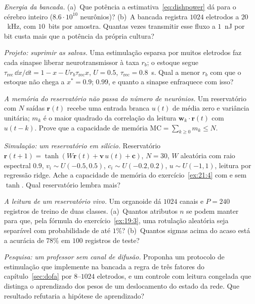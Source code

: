 \begin{exercise}[\lvlA]
\label{ex:21:2}
\emph{Energia da bancada.} (a)~Que potência a estimativa~\eqref{eq:dishpower} dá para o cérebro inteiro ($8.6\cdot10^{10}$ neurônios)? (b)~A bancada registra $1024$ eletrodos a $20$~kHz, com $10$~bits por amostra. Quantas vezes transmitir esse fluxo a $1$~nJ por bit custa mais que a potência da própria cultura?
\end{exercise}

\begin{exercise}[\lvlB]
\label{ex:21:3}
\emph{Projeto: suprimir as salvas.} Uma estimulação esparsa por muitos eletrodos faz cada sinapse liberar neurotransmissor à taxa $r_b$; o estoque segue $\tau_{\text{rec}}\,\dd x/\dd t=1-x-Ur_b\tau_{\text{rec}}x$, $U=0.5$, $\tau_{\text{rec}}=0.8$~s. Qual a menor $r_b$ com que o estoque não chega a $x^*=0.9$; $0.99$, e quanto a sinapse enfraquece com isso?
\end{exercise}

\begin{exercise}[\lvlB]
\label{ex:21:4}
\emph{A memória do reservatório não passa do número de neurônios.} Um reservatório com $N$ saídas $\mathbf r(t)$ recebe uma entrada branca $u(t)$ de média zero e variância unitária; $m_k$ é o maior quadrado da correlação da leitura $\mathbf w_k\cdot\mathbf r(t)$ com $u(t-k)$. Prove que a capacidade de memória $\mathrm{MC}=\sum_{k\ge0}m_k\le N$.
\end{exercise}

\begin{exercise}[\lvlB]
\label{ex:21:5}
\emph{Simulação: um reservatório em silício.} Reservatório $\mathbf r(t+1)=\tanh(W\mathbf r(t)+\mathbf v\,u(t)+\mathbf c)$, $N=30$, $W$ aleatória com raio espectral $0.9$, $v_i\sim U(-0.5,0.5)$, $c_i\sim U(-0.2,0.2)$, $u\sim U(-1,1)$, leitura por regressão ridge. Ache a capacidade de memória do exercício~\ref{ex:21:4} com e sem $\tanh$. Qual reservatório lembra mais?
\end{exercise}

\begin{exercise}[\lvlB]
\label{ex:21:6}
\emph{A leitura de um reservatório vivo.} Um organoide dá $1024$ canais e $P=240$ registros de treino de duas classes. (a)~Quantos atributos $n$ se podem manter para que, pela fórmula do exercício~\ref{ex:19:3}, uma rotulação aleatória seja separável com probabilidade de até $1\%$? (b)~Quantos sigmas acima do acaso está a acurácia de $78\%$ em $100$ registros de teste?
\end{exercise}

\begin{exercise}[\lvlC]
\label{ex:21:7}
\emph{Pesquisa: um professor sem canal de difusão.} Proponha um protocolo de estimulação que implemente na bancada a regra de três fatores do capítulo~\ref{sec:dofa} por $8$--$1024$ eletrodos, e um controle com leitura congelada que distinga o aprendizado dos pesos de um deslocamento do estado da rede. Que resultado refutaria a hipótese de aprendizado?
\end{exercise}
